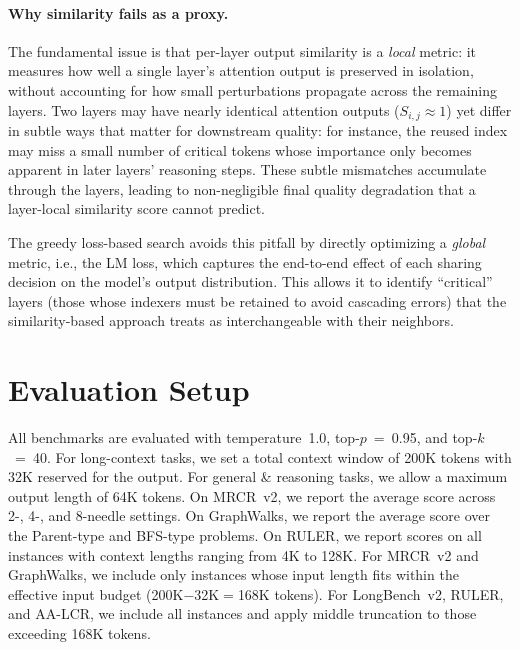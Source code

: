 \paragraph{Why similarity fails as a proxy.}
The fundamental issue is that per-layer output similarity is a \emph{local} metric: it measures how well a single layer's attention output is preserved in isolation, without accounting for how small perturbations propagate across the remaining layers.
Two layers may have nearly identical attention outputs ($S_{i,j} \approx 1$) yet differ in subtle ways that matter for downstream quality: for instance, the reused index may miss a small number of critical tokens whose importance only becomes apparent in later layers' reasoning steps.
These subtle mismatches accumulate through the layers, leading to non-negligible final quality degradation that a layer-local similarity score cannot predict.

The greedy loss-based search avoids this pitfall by directly optimizing a \emph{global} metric, i.e., the LM loss, which captures the end-to-end effect of each sharing decision on the model's output distribution.
This allows it to identify ``critical'' layers (those whose indexers must be retained to avoid cascading errors) that the similarity-based approach treats as interchangeable with their neighbors.

\section{Evaluation Setup}
\label{app:eval}
All benchmarks are evaluated with temperature~1.0, top-$p$~=~0.95, and top-$k$~=~40. For long-context tasks, we set a total context window of 200K tokens with 32K reserved for the output. For general \& reasoning tasks, we allow a maximum output length of 64K tokens.
On MRCR~v2, we report the average score across 2-, 4-, and 8-needle settings.
On GraphWalks, we report the average score over the Parent-type and BFS-type problems.
On RULER, we report scores on all instances with context lengths ranging from 4K to 128K.
For MRCR~v2 and GraphWalks, we include only instances whose input length fits within the effective input budget (200K$-$32K$=$168K tokens).
For LongBench~v2, RULER, and AA-LCR, we include all instances and apply middle truncation to those exceeding 168K tokens.